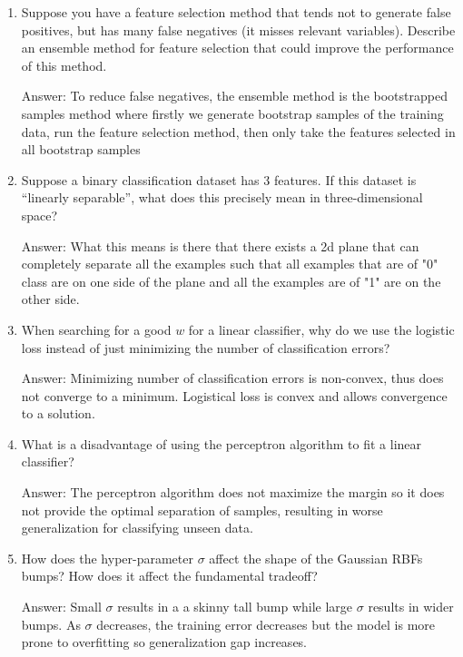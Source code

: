 \documentclass{article}
\newcommand{\gre}[1]{\textcolor{gre}{#1}}
\newcommand\ans[1]{\par\gre{Answer: #1}}
\begin{document}
\begin{enumerate}
\item Suppose you have a feature selection method that tends not to generate false positives, but has many false negatives (it misses relevant variables). Describe an ensemble method for feature selection that could improve the performance of this method.
\ans{To reduce false negatives, the ensemble method is the bootstrapped samples method where firstly we generate bootstrap samples of the training data, run the feature selection method, then only take the features selected in all bootstrap samples}

\item Suppose a binary classification dataset has 3 features. If this dataset is ``linearly separable'', what does this precisely mean in three-dimensional space?
\ans{ What this means is there that there exists a 2d plane that can completely separate all the examples such that all examples that are of "0" class are on one side of the plane and all the examples are of "1" are on the other side. }

\item When searching for a good $w$ for a linear classifier, why do we use the logistic loss instead of just minimizing the number of classification errors?
\ans{ Minimizing number of classification errors is non-convex, thus does not converge to a minimum. Logistical loss is convex and allows convergence to a solution. }

\item What is a disadvantage of using the perceptron algorithm to fit a linear classifier?
\ans{ The perceptron algorithm does not maximize the margin so it does not provide the optimal separation of samples, resulting in worse generalization for classifying unseen data. }

\item How does the hyper-parameter $\sigma$ affect the shape of the Gaussian RBFs bumps? How does it affect the fundamental tradeoff?
\ans{ Small $\sigma$ results in a a skinny tall bump while large $\sigma$ results in wider bumps. As $\sigma$ decreases, the training error decreases but the model is more prone to overfitting so generalization gap increases. }

\end{enumerate}
\end{document}
